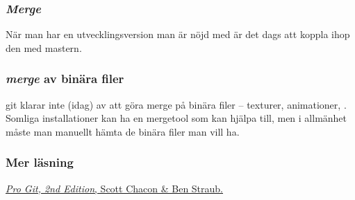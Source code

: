 \documentclass[swedish]{beamer}
\begin{document}
\begin{frame}[fragile]
\frametitle{\emph{Merge}}

När man har en utvecklingsversion man är nöjd med är det dags att koppla ihop den med mastern.  

\end{frame}

\begin{frame}[fragile]
\frametitle{\emph{merge} av binära filer}
git klarar inte (idag) av att göra merge på binära filer -- \mao texturer, animationer, \odyl.  Somliga installationer kan ha en mergetool som kan hjälpa till, men i allmänhet måste man manuellt hämta de binära filer man vill ha.
  
\end{frame}


\begin{frame}[fragile]
\frametitle{Mer läsning}  
\href{http://git-scm.com/book/en/v2/}{\textsl{Pro Git, 2nd Edition}, Scott Chacon \& Ben Straub.}
\end{frame}
\end{document}
